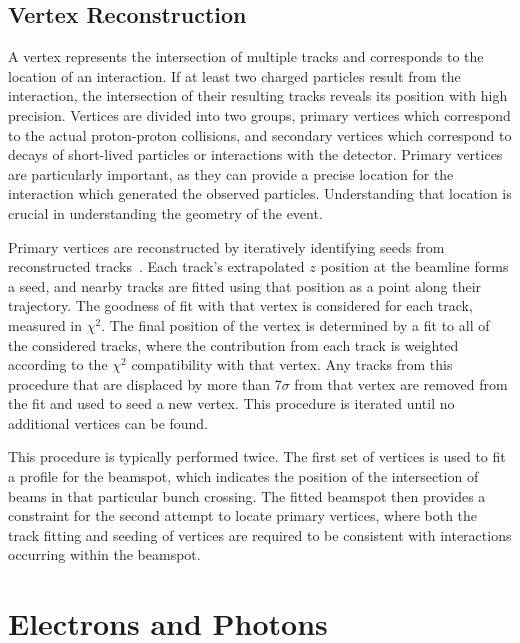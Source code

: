 \subsection{Vertex Reconstruction}
\label{sec:vertices}

A vertex represents the intersection of multiple tracks and corresponds to the location of an interaction.
If at least two charged particles result from the interaction, the intersection of their resulting tracks reveals its position with high precision.
Vertices are divided into two groups, primary vertices which correspond to the actual proton-proton collisions, and secondary vertices which correspond to decays of short-lived particles or interactions with the detector. 
Primary vertices are particularly important, as they can provide a precise location for the interaction which generated the observed particles.
Understanding that location is crucial in understanding the geometry of the event.

Primary vertices are reconstructed by iteratively identifying seeds from reconstructed tracks~\cite{ATLAS-CONF-2010-069}.
Each track's extrapolated $z$ position at the beamline forms a seed, and nearby tracks are fitted using that position as a point along their trajectory.
The goodness of fit with that vertex is considered for each track, measured in $\chi^2$. 
The final position of the vertex is determined by a fit to all of the considered tracks, where the contribution from each track is weighted according to the $\chi^2$ compatibility with that vertex.
Any tracks from this procedure that are displaced by more than 7$\sigma$ from that vertex are removed from the fit and used to seed a new vertex.
This procedure is iterated until no additional vertices can be found.

This procedure is typically performed twice.
The first set of vertices is used to fit a profile for the beamspot, which indicates the position of the intersection of beams in that particular bunch crossing.
The fitted beamspot then provides a constraint for the second attempt to locate primary vertices, where both the track fitting and seeding of vertices are required to be consistent with interactions occurring within the beamspot.


\section{Electrons and Photons}
\label{sec:egamma}

